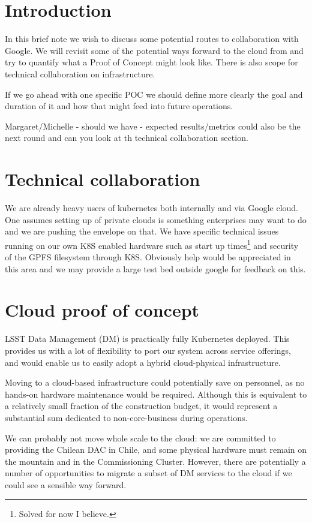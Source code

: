 
\section{Introduction}
In this brief note we wish to discuss some potential routes to collaboration with Google. We will revisit some of the potential ways forward to the cloud from  and try to quantify what a Proof of Concept might look like. There is also scope for technical collaboration on infrastructure.

If we go ahead with one specific POC we should define more clearly the goal and duration of it and how that might feed into future operations.

{\color{red} Margaret/Michelle - should we have - expected results/metrics could also be the next round and can you look at th technical collaboration section. }
\section{Technical collaboration}
We are already heavy users of kubernetes both internally and via Google cloud.  One assumes setting up of private clouds is something enterprises may want to do and we are pushing the envelope on that. We have specific technical issues running on our own K8S enabled hardware such as start up times\footnote{Solved for now I believe.} and security of the GPFS filesystem through K8S. Obviously help would be appreciated in this area and we may provide a large test bed outside google for feedback on this.

\section{Cloud proof of concept}\label{sect:pocs}

LSST Data Management (DM) is practically fully  Kubernetes deployed.
This provides us with a lot of flexibility to port our system across service offerings, and would enable us to easily adopt a hybrid cloud-physical infrastructure.

Moving to a cloud-based infrastructure could potentially  save on personnel, as no hands-on hardware maintenance would be required.
Although this is equivalent to a relatively small fraction of the construction budget, it would represent a substantial sum dedicated to non-core-business during operations.

We can probably not move whole scale to the cloud:
we are committed to providing the Chilean DAC in Chile, and some physical hardware must remain on the mountain and in the Commissioning Cluster.
However, there are potentially a number of opportunities to migrate a subset of DM services to the cloud if we could see a sensible way forward.


